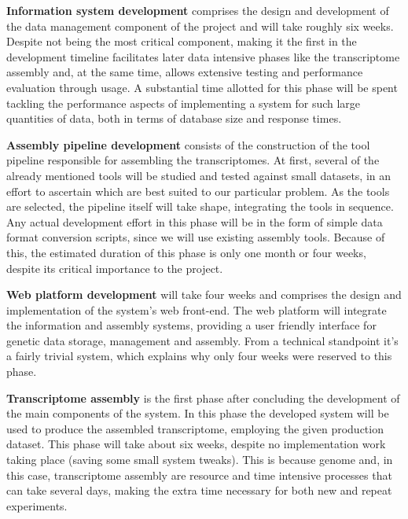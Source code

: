 \begin{description}

  \item \textbf{Information system development}
  comprises the design and development of the data management component of the
  project and will take roughly six weeks. Despite not being the most critical
  component, making it the first in the development timeline facilitates later
  data intensive phases like the transcriptome assembly and, at the same time,
  allows extensive testing and performance evaluation through usage. A
  substantial time allotted for this phase will be spent tackling the
  performance aspects of implementing a system for such large quantities of
  data, both in terms of database size and response times.

  \item \textbf{Assembly pipeline development}
  consists of the construction of the tool pipeline responsible for assembling
  the transcriptomes. At first, several of the already mentioned tools will be
  studied and tested against small datasets, in an effort to ascertain which are
  best suited to our particular problem. As the tools are selected, the pipeline
  itself will take shape, integrating the tools in sequence. Any actual
  development effort in this phase will be in the form of simple data format
  conversion scripts, since we will use existing assembly tools. Because of
  this, the estimated duration of this phase is only one month or four weeks,
  despite its critical importance to the project.

  \item \textbf{Web platform development}
  will take four weeks and comprises the design and implementation of the
  system's web front-end. The web platform will integrate the information and
  assembly systems, providing a user friendly interface for genetic data
  storage, management and assembly. From a technical standpoint it's a fairly
  trivial system, which explains why only four weeks were reserved to this
  phase.

  \item \textbf{Transcriptome assembly}
  is the first phase after concluding the development of the main components of
  the system. In this phase the developed system will be used to produce the
  assembled transcriptome, employing the given production dataset. This phase
  will take about six weeks, despite no implementation work taking place (saving
  some small system tweaks). This is because genome and, in this case,
  transcriptome assembly are resource and time intensive processes that can
  take several days, making the extra time necessary for both new and repeat
  experiments.


\end{description}

